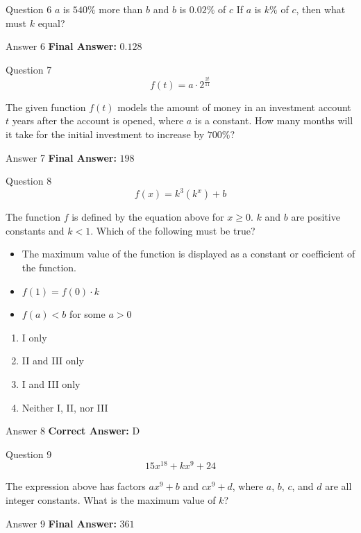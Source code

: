 \documentclass{beamer}
\begin{document}
\begin{frame}{Question 6}
\small
$a$ is $540\%$ more than $b$ and $b$ is $0.02\%$ of $c$
If $a$ is $k\%$ of $c$, then what must $k$ equal?
\end{frame}
\begin{frame}{Answer 6}
\small
\textbf{Final Answer:} $\boxed{0.128}$
\end{frame}

\begin{frame}{Question 7}
\small
\[
f(t)=a\cdot 2^{\frac{2t}{11}}
\]

The given function $f(t)$ models the amount of money in an investment account $t$ years after the account is opened, where $a$ is a constant.  
How many months will it take for the initial investment to increase by $700\%$?
\end{frame}
\begin{frame}{Answer 7}
\small
\textbf{Final Answer:} $\boxed{198}$
\end{frame}

\begin{frame}{Question 8}
\small
\[
f(x)=k^{3}(k^{x})+b
\]

The function $f$ is defined by the equation above for $x\ge 0$.  
$k$ and $b$ are positive constants and $k<1$. Which of the following must be true?

\begin{itemize}
\item[I.] The maximum value of the function is displayed as a constant or coefficient of the function.
\item[II.] $f(1)=f(0)\cdot k$
\item[III.] $f(a)<b$ for some $a>0$
\end{itemize}
\vspace{0.35cm}
\begin{enumerate}
    \item[A.] I only
    \item[B.] II and III only
    \item[C.] I and III only
    \item[D.] Neither I, II, nor III
\end{enumerate}
\end{frame}
\begin{frame}{Answer 8}
\small
\textbf{Correct Answer:} D
\end{frame}

\begin{frame}{Question 9}
\small
\[
15x^{18} + kx^{9} + 24
\]

The expression above has factors $ax^{9}+b$ and $cx^{9}+d$, where $a$, $b$, $c$, and $d$ are all integer constants.  
What is the maximum value of $k$?
\end{frame}
\begin{frame}{Answer 9}
\small
\textbf{Final Answer:} $\boxed{361}$
\end{frame}
\end{document}
